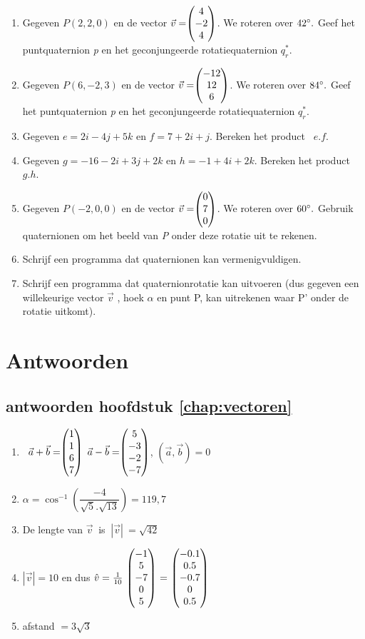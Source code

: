 \documentclass[hidelinks, a4wide, 12pt,  twoside]{book}
\begin{document}
\begin{enumerate}
	\item Gegeven $ P (2,2,0) $ en de vector $\vec{v} = \vecdrie{4}{-2}{4} $. 
	We roteren over $ 42\degree. $ Geef het puntquaternion \textit{p} en het geconjungeerde rotatiequaternion  $  q_r^* $. 
	
	\item Gegeven $ P (6,-2,3) $ en de vector $\vec{v} = \vecdrie{-12}{12}{6} $. 
	We roteren over $ 84\degree. $ Geef het puntquaternion \textit{p} en het geconjungeerde rotatiequaternion  $  q_r^* $. 
	
	\item Gegeven $ e = 2i-4j+5k$ en   $ f = 7+2i+j $. 
	Bereken het product \ $  e.f $.
	
	\item Gegeven $ g = -16 -2i+3j+2k $ en   $ h = -1+4i+2k $. 
	Bereken het product \ $  g.h $.
	
	\item  Gegeven $ P (-2, 0, 0) $ en de vector $\vec{v} = \vecdrie{0}{7}{0} $. 
	We roteren over $ 60\degree. $ Gebruik quaternionen om het beeld van \textit{P }onder deze rotatie uit te rekenen.   
	
	\item Schrijf een programma dat quaternionen kan vermenigvuldigen.   
	
	\item Schrijf een programma dat quaternionrotatie kan uitvoeren (dus gegeven een willekeurige vector $\vec{v} $ , hoek $ \alpha $ en punt P, kan uitrekenen waar P' onder de rotatie uitkomt).      
	
\end{enumerate}

\chapter{Antwoorden}

\section{antwoorden  hoofdstuk \ref{chap:vectoren}}
\begin{enumerate}
	\item   \ $ \vec{a} + \vec{b}  = \vecvier{1}{1}{6}{7} $   \qquad $ \vec{a} - \vec{b} = \vecvier{5}{-3}{-2}{-7} $,   \qquad $  (\vec{a} , \vec{b}) = 0 $ 
	
	
	\item  $\alpha = \cos ^{-1} (\dfrac{-4}{\sqrt{5}.\sqrt{13}}) = 119,7 $ 
	
	
	
	\item De lengte van  $  \vec{v} \ $ is $ \ |\vec{v}| \  =  \sqrt{42}$
	
	
	\item $|\vec{v}| = 10$ en dus $ \hat{v} = \frac{1}{10}\  \vecvijf{-1}{5}{-7}{0}{5} \  = \  \vecvijf{-0.1}{0.5}{-0.7}{0}{0.5} $
	
	\item afstand  $ = 3\sqrt{3} $
	
	
\end{enumerate}
\end{document}
